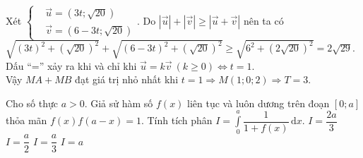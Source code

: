 \begin{ex}
{		Xét $\left\{\begin{aligned}
		&\overrightarrow{u}=\left(3t;\sqrt{20}\right) \\
		&\overrightarrow{v}=\left(6-3t;\sqrt{20}\right)
		\end{aligned}\right. $. Do $\left|\overrightarrow{u}\right|+\left|\overrightarrow{v}\right|\ge \left|\overrightarrow{u}+\overrightarrow{v}\right|$ nên ta có\\
		$\sqrt{(3t)^2+{\left(\sqrt{20}\right)}^2}+\sqrt{(6-3t)^2+{\left(\sqrt{20}\right)}^2}\ge \sqrt{6^2+{\left(2\sqrt{20}\right)}^2}=2\sqrt{29}$.\\
		Dấu “=” xảy ra khi và chỉ khi $\overrightarrow{u}=k\overrightarrow{v}~(k\ge 0) \Leftrightarrow t=1$.\\
		Vậy $MA+MB$ đạt giá trị nhỏ nhất khi $t=1 \Rightarrow M(1;0;2) \Rightarrow T=3$.
	}
\end{ex}
\begin{ex}%
	Cho số thực $a>0$. Giả sử hàm số $f(x)$ liên tục và luôn dương trên đoạn $[0;a]$ thỏa mãn $f(x) f(a-x)=1$. Tính tích phân $I=\displaystyle\int\limits_0^a \dfrac{1}{1+f(x)} \mathrm{\,d}x$.
	\choice
	{$I=\dfrac{2a}{3}$}
	{\True $I=\dfrac{a}{2}$}
	{$I=\dfrac{a}{3}$}
	{$I=a$}
\end{ex}


